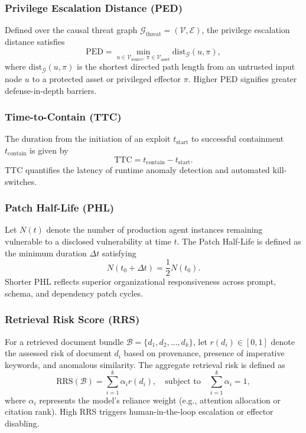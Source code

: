 \subsubsection{Privilege Escalation Distance (PED)}
Defined over the causal threat graph $\mathcal{G}_{\text{threat}} = (\mathcal{V}, \mathcal{E})$, the privilege escalation distance satisfies
\begin{equation}
    \text{PED} = \min_{u \in \mathcal{V}_{\text{source}}, \, \pi \in \mathcal{V}_{\text{asset}}} \text{dist}_{\mathcal{G}}(u, \pi),
\end{equation}
where $\text{dist}_{\mathcal{G}}(u, \pi)$ is the shortest directed path length from an untrusted input node $u$ to a protected asset or privileged effector $\pi$. Higher PED signifies greater defense-in-depth barriers.

\subsubsection{Time-to-Contain (TTC)}
The duration from the initiation of an exploit $t_{\text{start}}$ to successful containment $t_{\text{contain}}$ is given by
\begin{equation}
    \text{TTC} = t_{\text{contain}} - t_{\text{start}}.
\end{equation}
TTC quantifies the latency of runtime anomaly detection and automated kill-switches.

\subsubsection{Patch Half-Life (PHL)}
Let $N(t)$ denote the number of production agent instances remaining vulnerable to a disclosed vulnerability at time $t$. The Patch Half-Life is defined as the minimum duration $\Delta t$ satisfying
\begin{equation}
    N(t_0 + \Delta t) = \frac{1}{2} N(t_0).
\end{equation}
Shorter PHL reflects superior organizational responsiveness across prompt, schema, and dependency patch cycles.

\subsubsection{Retrieval Risk Score (RRS)}
For a retrieved document bundle $\mathcal{B} = \{d_1, d_2, \dots, d_k\}$, let $r(d_i) \in [0, 1]$ denote the assessed risk of document $d_i$ based on provenance, presence of imperative keywords, and anomalous similarity. The aggregate retrieval risk is defined as
\begin{equation}
    \text{RRS}(\mathcal{B}) = \sum_{i=1}^k \alpha_i r(d_i), \quad \text{subject to} \quad \sum_{i=1}^k \alpha_i = 1,
\end{equation}
where $\alpha_i$ represents the model's reliance weight (e.g., attention allocation or citation rank). High RRS triggers human-in-the-loop escalation or effector disabling.


